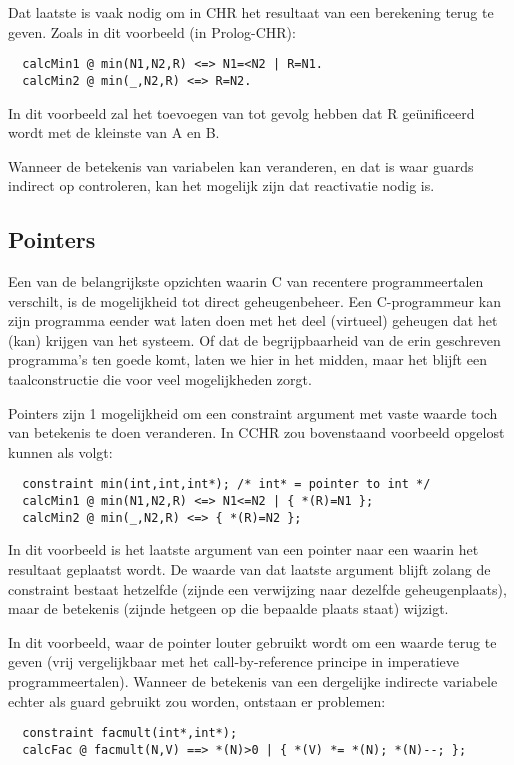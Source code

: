 Dat laatste is vaak nodig om in CHR het resultaat van een berekening terug te geven. Zoals in dit voorbeeld (in Prolog-CHR): \begin{Verbatim}
  calcMin1 @ min(N1,N2,R) <=> N1=<N2 | R=N1.
  calcMin2 @ min(_,N2,R) <=> R=N2.
\end{Verbatim}
In dit voorbeeld zal het toevoegen van  tot gevolg hebben dat R ge\"unificeerd wordt met de kleinste van A en B.

Wanneer de betekenis van variabelen kan veranderen, en dat is waar guards indirect op controleren, kan het mogelijk zijn dat reactivatie nodig is.

\subsection{Pointers}

Een van de belangrijkste opzichten waarin C van recentere programmeertalen verschilt, is de mogelijkheid tot direct geheugenbeheer. Een C-programmeur kan zijn programma eender wat laten doen met het deel (virtueel) geheugen dat het (kan) krijgen van het systeem. Of dat de begrijpbaarheid van de erin geschreven programma's ten goede komt, laten we hier in het midden, maar het blijft een taalconstructie die voor veel mogelijkheden zorgt.

Pointers zijn 1 mogelijkheid om een constraint argument met vaste waarde toch van betekenis te doen veranderen. In CCHR
zou bovenstaand voorbeeld opgelost kunnen als volgt: \begin{Verbatim}
  constraint min(int,int,int*); /* int* = pointer to int */
  calcMin1 @ min(N1,N2,R) <=> N1<=N2 | { *(R)=N1 };
  calcMin2 @ min(_,N2,R) <=> { *(R)=N2 };
\end{Verbatim}

In dit voorbeeld is het laatste argument van  een pointer naar een  waarin het resultaat geplaatst wordt. De
waarde van dat laatste argument blijft zolang de constraint bestaat hetzelfde (zijnde een verwijzing naar dezelfde
geheugenplaats), maar de betekenis (zijnde hetgeen op die bepaalde plaats staat) wijzigt.

In dit voorbeeld, waar de pointer louter gebruikt wordt om een waarde terug te geven (vrij vergelijkbaar met het call-by-reference principe in imperatieve programmeertalen). Wanneer de betekenis van een dergelijke indirecte variabele echter als guard gebruikt zou worden, ontstaan er problemen: \begin{Verbatim}
  constraint facmult(int*,int*);
  calcFac @ facmult(N,V) ==> *(N)>0 | { *(V) *= *(N); *(N)--; };
\end{Verbatim}

